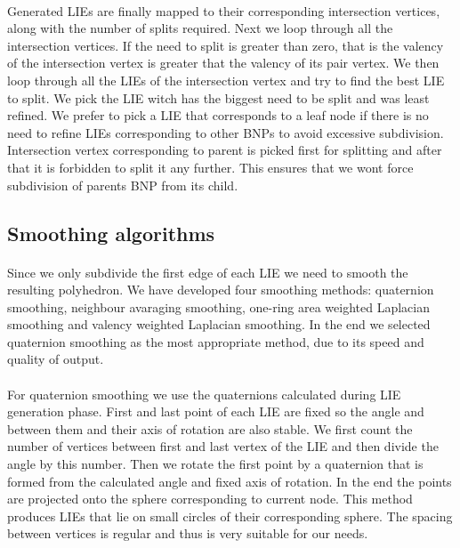 \paragraph{}
Generated LIEs are finally mapped to their corresponding intersection vertices, along with the number of splits required. Next we loop through all the intersection vertices. If the need to split is greater than zero, that is the valency of the intersection vertex is greater that the valency of its pair vertex. We then loop through all the LIEs of the intersection vertex and try to find the best LIE to split. We pick the LIE witch has the biggest need to be split and was least refined. We prefer to pick a LIE that corresponds to a leaf node if there is no need to refine LIEs corresponding to other BNPs to avoid excessive subdivision. Intersection vertex corresponding to parent is picked first for splitting and after that it is forbidden to split it any further. This ensures that we wont force subdivision of parents BNP from its child.

\subsection{Smoothing algorithms}
\paragraph{}
Since we only subdivide the first edge of each LIE we need to smooth the resulting polyhedron. We have developed four smoothing methods: quaternion smoothing, neighbour avaraging smoothing, one-ring area weighted Laplacian smoothing and valency weighted Laplacian smoothing. In the end we selected quaternion smoothing as the most appropriate method, due to its speed and quality of output.
\paragraph{}
For quaternion smoothing we use the quaternions calculated during LIE generation phase. First and last point of each LIE are fixed so the angle and between them and their axis of rotation are also stable. We first count the number of vertices between first and last vertex of the LIE and then divide the angle by this number. Then we rotate the first point by a quaternion that is formed from the calculated angle and fixed axis of rotation. In the end the points are projected onto the sphere corresponding to current node. This method produces LIEs that lie on small circles of their corresponding sphere. The spacing between vertices is regular and thus is very suitable for our needs.
